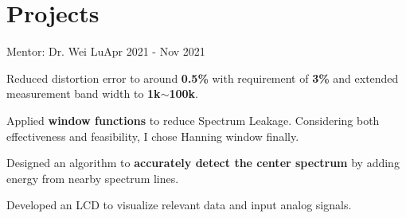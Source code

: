 \vspace{-5pt}
\section{Projects}
\resumeSubHeadingListStart

{Mentor: Dr. Wei Lu}{Apr 2021 - Nov 2021}
\resumeItemListStart
\item\small
Reduced distortion error to around \textbf{0.5\%} with requirement of \textbf{3\%} and extended measurement band width to \textbf{1k$\sim$100k}.
\item\small
Applied \textbf{window functions} to reduce Spectrum Leakage. Considering both effectiveness and feasibility, I chose Hanning window finally.
\item\small
Designed an algorithm to \textbf{accurately detect the center spectrum} by adding energy from nearby spectrum lines.
\item\small
Developed an LCD to visualize relevant data and input analog signals.
\resumeItemListEnd

\resumeSubHeadingListEnd
\vspace{-5pt}

